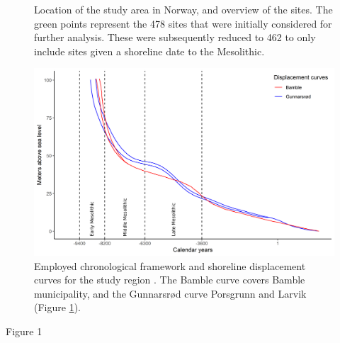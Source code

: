 \documentclass[12pt, a4paper]{article}
\begin{document}
\begin{figure}[h]
	\centering
	\caption{Location of the study area in Norway, and overview of the sites. The green
		points represent the 478 sites that were initially considered for further analysis. These
		were subsequently reduced to 462 to only include sites given a shoreline date to the Mesolithic.}
	\label{fig:overview}
\end{figure}
\begin{figure}[h]
	\centering
	\includegraphics[width = \linewidth]{displacement.png}
	\caption{Employed chronological framework and shoreline displacement curves for the study region \citep[after][]{sorensen2014, sorensen2015}. The Bamble curve covers Bamble municipality, and the Gunnarsr{\o}d curve Porsgrunn and Larvik (Figure \ref{fig:overview}).}
	\label{fig:displacement}
\end{figure}

Figure 1
\end{document}
